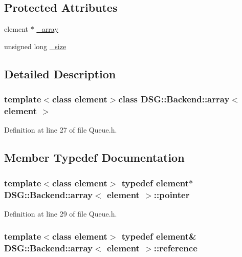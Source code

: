 \subsection*{Protected Attributes}
\begin{DoxyCompactItemize}
\item 
element $\ast$ \hyperlink{classDSG_1_1Backend_1_1array_a520f838f921d4f48852694e79da0564c}{\+\_\+array}
\item 
unsigned long \hyperlink{classDSG_1_1Backend_1_1array_a44349f32c09ebb31d5eadbe9a222cba2}{\+\_\+size}
\end{DoxyCompactItemize}


\subsection{Detailed Description}
\subsubsection*{template$<$class element$>$class D\+S\+G\+::\+Backend\+::array$<$ element $>$}



Definition at line 27 of file Queue.\+h.



\subsection{Member Typedef Documentation}
\hypertarget{classDSG_1_1Backend_1_1array_abfd0db2267892f4d2f397638faf85ca3}{
\subsubsection[{pointer}]{\setlength{\rightskip}{0pt plus 5cm}template$<$class element$>$ typedef element$\ast$ {\bf D\+S\+G\+::\+Backend\+::array}$<$ element $>$\+::{\bf pointer}}}\label{classDSG_1_1Backend_1_1array_abfd0db2267892f4d2f397638faf85ca3}


Definition at line 29 of file Queue.\+h.

\hypertarget{classDSG_1_1Backend_1_1array_a8af2a20d445daee75e9e6b122498e0a6}{
\subsubsection[{reference}]{\setlength{\rightskip}{0pt plus 5cm}template$<$class element$>$ typedef element\& {\bf D\+S\+G\+::\+Backend\+::array}$<$ element $>$\+::{\bf reference}}}\label{classDSG_1_1Backend_1_1array_a8af2a20d445daee75e9e6b122498e0a6}


